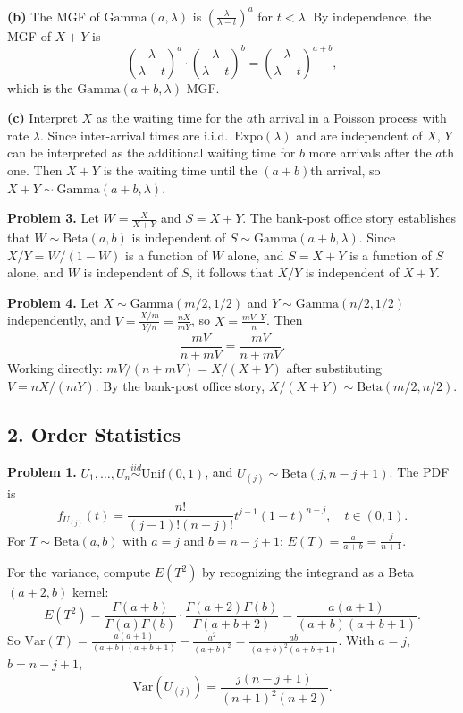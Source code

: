 \documentclass{article}
\begin{document}
\textbf{(b)} The MGF of $\text{Gamma}(a,\lambda)$ is $\left(\frac{\lambda}{\lambda-t}\right)^a$ for $t<\lambda$. By independence, the MGF of $X+Y$ is
$$
\left(\frac{\lambda}{\lambda-t}\right)^a\!\cdot\!\left(\frac{\lambda}{\lambda-t}\right)^b = \left(\frac{\lambda}{\lambda-t}\right)^{a+b},
$$
which is the $\text{Gamma}(a+b,\lambda)$ MGF.

\textbf{(c)} Interpret $X$ as the waiting time for the $a$th arrival in a Poisson process with rate $\lambda$. Since inter-arrival times are i.i.d.\ $\text{Expo}(\lambda)$ and are independent of $X$, $Y$ can be interpreted as the additional waiting time for $b$ more arrivals after the $a$th one. Then $X+Y$ is the waiting time until the $(a+b)$th arrival, so $X+Y\sim\text{Gamma}(a+b,\lambda)$.

\bigskip
\textbf{Problem 3.} Let $W=\frac{X}{X+Y}$ and $S=X+Y$. The bank-post office story establishes that $W\sim\text{Beta}(a,b)$ is independent of $S\sim\text{Gamma}(a+b,\lambda)$. Since $X/Y = W/(1-W)$ is a function of $W$ alone, and $S=X+Y$ is a function of $S$ alone, and $W$ is independent of $S$, it follows that $X/Y$ is independent of $X+Y$.

\bigskip
\textbf{Problem 4.} Let $X\sim\text{Gamma}(m/2,1/2)$ and $Y\sim\text{Gamma}(n/2,1/2)$ independently, and $V=\frac{X/m}{Y/n}=\frac{nX}{mY}$, so $X=\frac{mV\cdot Y}{n}$. Then
$$
\frac{mV}{n+mV} = \frac{mV}{n+mV}.
$$
Working directly: $mV/(n+mV)=X/(X+Y)$ after substituting $V=nX/(mY)$. By the bank-post office story, $X/(X+Y)\sim\text{Beta}(m/2,n/2)$.

\subsection*{2. Order Statistics}

\textbf{Problem 1.} $U_1,\dots,U_n\overset{iid}{\sim}\text{Unif}(0,1)$, and $U_{(j)}\sim\text{Beta}(j,n-j+1)$. The PDF is
$$
f_{U_{(j)}}(t) = \frac{n!}{(j-1)!(n-j)!}t^{j-1}(1-t)^{n-j}, \quad t\in(0,1).
$$
For $T\sim\text{Beta}(a,b)$ with $a=j$ and $b=n-j+1$: $E(T)=\frac{a}{a+b}=\frac{j}{n+1}$.

For the variance, compute $E(T^2)$ by recognizing the integrand as a Beta$(a+2,b)$ kernel:
$$
E(T^2) = \frac{\Gamma(a+b)}{\Gamma(a)\Gamma(b)}\cdot\frac{\Gamma(a+2)\Gamma(b)}{\Gamma(a+b+2)} = \frac{a(a+1)}{(a+b)(a+b+1)}.
$$
So $\text{Var}(T)=\frac{a(a+1)}{(a+b)(a+b+1)}-\frac{a^2}{(a+b)^2}=\frac{ab}{(a+b)^2(a+b+1)}$. With $a=j$, $b=n-j+1$,
$$
\text{Var}(U_{(j)}) = \frac{j(n-j+1)}{(n+1)^2(n+2)}.
$$
\end{document}
